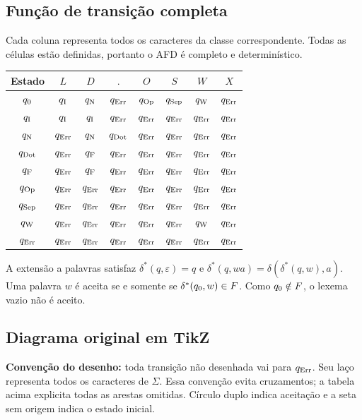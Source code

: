 \documentclass[12pt,a4paper]{article}
\begin{document}
\subsection{Função de transição completa}
Cada coluna representa todos os caracteres da classe correspondente. Todas
as células estão definidas, portanto o AFD é completo e determinístico.
\begin{center}\small
\begin{tabular}{c|ccccccc}
\toprule Estado & $L$ & $D$ & $.$ & $O$ & $S$ & $W$ & $X$\\\midrule
$q_{\mathrm{0}}$ & $q_{\mathrm{I}}$ & $q_{\mathrm{N}}$ & $q_{\mathrm{Err}}$ & $q_{\mathrm{Op}}$ & $q_{\mathrm{Sep}}$ & $q_{\mathrm{W}}$ & $q_{\mathrm{Err}}$\\
$q_{\mathrm{I}}$ & $q_{\mathrm{I}}$ & $q_{\mathrm{I}}$ & $q_{\mathrm{Err}}$ & $q_{\mathrm{Err}}$ & $q_{\mathrm{Err}}$ & $q_{\mathrm{Err}}$ & $q_{\mathrm{Err}}$\\
$q_{\mathrm{N}}$ & $q_{\mathrm{Err}}$ & $q_{\mathrm{N}}$ & $q_{\mathrm{Dot}}$ & $q_{\mathrm{Err}}$ & $q_{\mathrm{Err}}$ & $q_{\mathrm{Err}}$ & $q_{\mathrm{Err}}$\\
$q_{\mathrm{Dot}}$ & $q_{\mathrm{Err}}$ & $q_{\mathrm{F}}$ & $q_{\mathrm{Err}}$ & $q_{\mathrm{Err}}$ & $q_{\mathrm{Err}}$ & $q_{\mathrm{Err}}$ & $q_{\mathrm{Err}}$\\
$q_{\mathrm{F}}$ & $q_{\mathrm{Err}}$ & $q_{\mathrm{F}}$ & $q_{\mathrm{Err}}$ & $q_{\mathrm{Err}}$ & $q_{\mathrm{Err}}$ & $q_{\mathrm{Err}}$ & $q_{\mathrm{Err}}$\\
$q_{\mathrm{Op}}$ & $q_{\mathrm{Err}}$ & $q_{\mathrm{Err}}$ & $q_{\mathrm{Err}}$ & $q_{\mathrm{Err}}$ & $q_{\mathrm{Err}}$ & $q_{\mathrm{Err}}$ & $q_{\mathrm{Err}}$\\
$q_{\mathrm{Sep}}$ & $q_{\mathrm{Err}}$ & $q_{\mathrm{Err}}$ & $q_{\mathrm{Err}}$ & $q_{\mathrm{Err}}$ & $q_{\mathrm{Err}}$ & $q_{\mathrm{Err}}$ & $q_{\mathrm{Err}}$\\
$q_{\mathrm{W}}$ & $q_{\mathrm{Err}}$ & $q_{\mathrm{Err}}$ & $q_{\mathrm{Err}}$ & $q_{\mathrm{Err}}$ & $q_{\mathrm{Err}}$ & $q_{\mathrm{W}}$ & $q_{\mathrm{Err}}$\\
$q_{\mathrm{Err}}$ & $q_{\mathrm{Err}}$ & $q_{\mathrm{Err}}$ & $q_{\mathrm{Err}}$ & $q_{\mathrm{Err}}$ & $q_{\mathrm{Err}}$ & $q_{\mathrm{Err}}$ & $q_{\mathrm{Err}}$\\\bottomrule
\end{tabular}\end{center}
A extensão a palavras satisfaz
$\delta^*(q,\varepsilon)=q$ e
$\delta^*(q,wa)=\delta(\delta^*(q,w),a)$.
Uma palavra $w$ é aceita se e somente se $\delta^*(q_{\mathrm{0}},w)\in F$.
Como $q_{\mathrm{0}}\notin F$, o lexema vazio não é aceito.

\subsection{Diagrama original em TikZ}
\begin{center}\end{center}
\textbf{Convenção do desenho:} toda transição não desenhada vai para
$q_{\mathrm{Err}}$. Seu laço representa todos os caracteres de $\Sigma$. Essa convenção
evita cruzamentos; a tabela acima explicita todas as arestas omitidas.
Círculo duplo indica aceitação e a seta sem origem indica o estado inicial.
\end{document}
